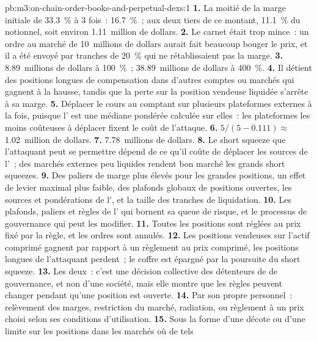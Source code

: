 \begin{solution}{pb:m3:on-chain-order-books-and-perpetual-dexs:1}
\textbf{1.} La moitié de la marge initiale de 33.3~\% à 3 fois~: 16.7~\%~; aux deux tiers de ce montant, 11.1~\% du notionnel, soit environ 1.11~million de dollars.
\textbf{2.} Le carnet était trop mince~: un ordre au marché de 10~millions de dollars aurait fait beaucoup bouger le prix, et il a été envoyé par tranches de 20~\% qui ne rétablissaient pas
la marge. \textbf{3.} 8.89~millions de dollars à 100~\%~; 38.89~millions de dollars à 400~\%. \textbf{4.} Il détient des positions longues de compensation dans d'autres
comptes ou marchés qui gagnent à la hausse, tandis que la perte sur la position vendeuse liquidée s'arrête à sa marge. \textbf{5.} Déplacer le cours au comptant sur
plusieurs plateformes externes à la fois, puisque l' est une médiane pondérée calculée sur elles~: les plateformes les moins coûteuses à déplacer fixent le coût de l'attaque.
\textbf{6.} $5/(5 - 0.111) \approx$ 1.02~million de dollars. \textbf{7.} 7.78~millions de dollars. \textbf{8.} Le short squeeze que l'attaquant peut se permettre dépend
de ce qu'il coûte de déplacer les sources de l'~; des marchés externes peu liquides rendent bon marché les grands short squeezes. \textbf{9.} Des paliers de marge plus élevés pour les grandes
positions, un effet de levier maximal plus faible, des plafonds globaux de positions ouvertes, les sources et pondérations de l', et la taille des tranches de liquidation. \textbf{10.} Les
plafonds, paliers et règles de l' qui bornent sa queue de risque, et le processus de gouvernance qui peut les modifier. \textbf{11.} Toutes les positions sont réglées au
prix fixé par la règle, et les ordres sont annulés. \textbf{12.} Les positions vendeuses sur l'actif comprimé gagnent par rapport à un règlement au prix comprimé, les
positions longues de l'attaquant perdent~; le coffre est épargné par la poursuite du short squeeze. \textbf{13.} Les deux~: c'est une décision collective des détenteurs de  de gouvernance, et non d'une
société, mais elle montre que les règles peuvent changer pendant qu'une position est ouverte. \textbf{14.} Par son propre personnel~: relèvement des marges, restriction du marché,
radiation, ou règlement à un prix choisi selon ses conditions d'utilisation. \textbf{15.} Sous la forme d'une décote ou d'une limite sur les positions dans les marchés où de tels

\end{solution}
